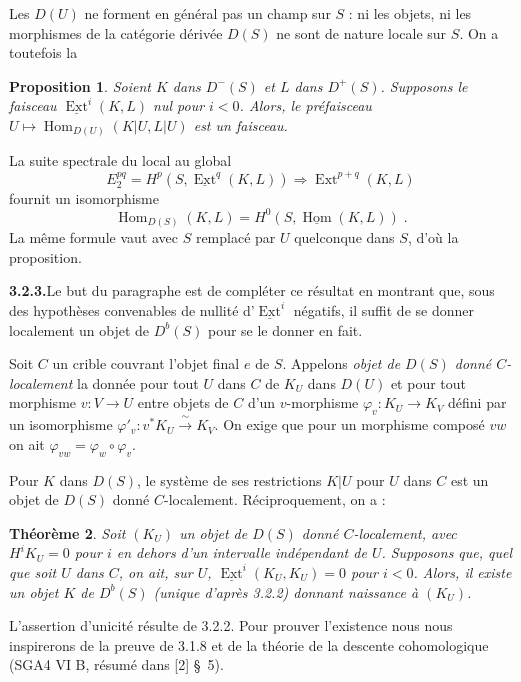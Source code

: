 \documentclass[12pt,a4paper]{article}
\theoremstyle{plain}
\newtheorem{theorem}{Th\'eor\`eme}[section]
\newtheorem{proposition}[theorem]{Proposition}
\theoremstyle{definition}
\DeclareMathOperator{\Hom}{Hom}
\DeclareMathOperator{\Ext}{Ext}
\begin{document}
Les $D(U)$ ne forment en g\'en\'eral pas un champ sur $S$ : ni les objets, ni les morphismes de la cat\'egorie d\'eriv\'ee $D(S)$ ne sont de nature locale sur $S$. On a toutefois la

\begin{proposition}\label{prop:3.2.2}
Soient $K$ dans $D^-(S)$ et $L$ dans $D^+(S)$. Supposons le faisceau $\underline{\Ext}^i(K, L)$ nul pour $i < 0$. Alors, le pr\'efaisceau $U \mapsto \Hom_{D(U)}(K|U, L|U)$ est un faisceau.
\end{proposition}

La suite spectrale du local au global
\[
E_2^{pq} = H^p(S, \underline{\Ext}^q(K, L)) \Rightarrow \Ext^{p+q}(K, L)
\]
fournit un isomorphisme
\[
\Hom_{D(S)}(K, L) = H^0(S, \underline{\Hom}(K, L))\;.
\]
La m\^eme formule vaut avec $S$ remplac\'e par $U$ quelconque dans $S$, d'o\`u la proposition.

\smallskip
\noindent\textbf{3.2.3.}\quad Le but du paragraphe est de compl\'eter ce r\'esultat en montrant que, sous des hypoth\`eses convenables de nullit\'e d'$\underline{\Ext}^i$ n\'egatifs, il suffit de se donner localement un objet de $D^b(S)$ pour se le donner en fait.

Soit $C$ un crible couvrant l'objet final $e$ de $S$. Appelons \emph{objet de $D(S)$ donn\'e $C$-localement} la donn\'ee pour tout $U$ dans $C$ de $K_U$ dans $D(U)$ et pour tout morphisme $v : V \to U$ entre objets de $C$ d'un $v$-morphisme $\varphi_v : K_U \to K_V$ d\'efini par un isomorphisme $\varphi'_v : v^* K_U \xrightarrow{\;\sim\;} K_V$. On exige que pour un morphisme compos\'e $vw$ on ait $\varphi_{vw} = \varphi_w \circ \varphi_v$.

Pour $K$ dans $D(S)$, le syst\`eme de ses restrictions $K|U$ pour $U$ dans $C$ est un objet de $D(S)$ donn\'e $C$-localement. R\'eciproquement, on a :

\begin{theorem}\label{thm:3.2.4}
Soit $(K_U)$ un objet de $D(S)$ donn\'e $C$-localement, avec $H^i K_U = 0$ pour $i$ en dehors d'un intervalle ind\'ependant de $U$. Supposons que, quel que soit $U$ dans $C$, on ait, sur $U$, $\underline{\Ext}^i(K_U, K_U) = 0$ pour $i < 0$. Alors, il existe un objet $K$ de $D^b(S)$ (unique d'apr\`es 3.2.2) donnant naissance \`a $(K_U)$.
\end{theorem}

L'assertion d'unicit\'e r\'esulte de 3.2.2. Pour prouver l'existence nous nous inspirerons de la preuve de 3.1.8 et de la th\'eorie de la descente cohomologique (SGA4 VI B, r\'esum\'e dans [2] \S\ 5).
\end{document}
